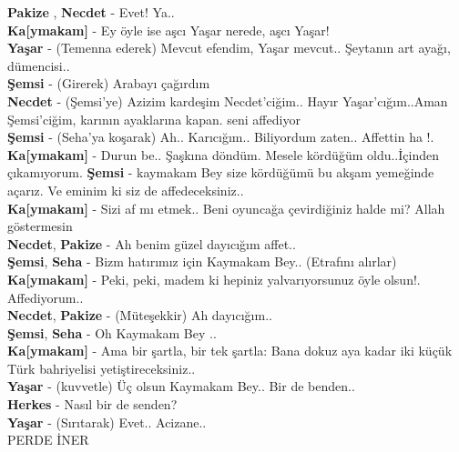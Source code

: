 \documentclass[]{book}
\begin{document}
\textbf{Pakize} , \textbf{Necdet} - Evet! Ya..\\
\textbf{Ka{[}ymakam{]}} - Ey öyle ise aşcı Yaşar nerede, aşcı Yaşar!\\
\textbf{Yaşar} - (Temenna ederek) Mevcut efendim, Yaşar mevcut.. Şeytanın art ayağı, dümencisi..\\
\textbf{Şemsi} - (Girerek) Arabayı çağırdım\\
\textbf{Necdet} - (Şemsi'ye) Azizim kardeşim Necdet'ciğim.. Hayır Yaşar'cığım..Aman Şemsi'ciğim, karının ayaklarına kapan. seni affediyor\\
\textbf{Şemsi} - (Seha'ya koşarak) Ah.. Karıcığım.. Biliyordum zaten.. Affettin ha !.\\
\textbf{Ka{[}ymakam{]}} - Durun be.. Şaşkına döndüm. Mesele kördüğüm oldu..İçinden çıkamıyorum.
\textbf{Şemsi} - kaymakam Bey size kördüğümü bu akşam yemeğinde açarız. Ve eminim ki siz de affedeceksiniz..\\
\textbf{Ka{[}ymakam{]}} - Sizi af mı etmek.. Beni oyuncağa çevirdiğiniz halde mi? Allah göstermesin\\
\textbf{Necdet}, \textbf{Pakize} - Ah benim güzel dayıcığım affet..\\
\textbf{Şemsi}, \textbf{Seha} - Bizm hatırımız için Kaymakam Bey.. (Etrafını alırlar)\\
\textbf{Ka{[}ymakam{]}} - Peki, peki, madem ki hepiniz yalvarıyorsunuz öyle olsun!. Affediyorum..\\
\textbf{Necdet}, \textbf{Pakize} - (Müteşekkir) Ah dayıcığım..\\
\textbf{Şemsi}, \textbf{Seha} - Oh Kaymakam Bey ..\\
\textbf{Ka{[}ymakam{]}} - Ama bir şartla, bir tek şartla: Bana dokuz aya kadar iki küçük Türk bahriyelisi yetiştireceksiniz..\\
\textbf{Yaşar} - (kuvvetle) Üç olsun Kaymakam Bey.. Bir de benden..\\
\textbf{Herkes} - Nasıl bir de senden?\\
\textbf{Yaşar} - (Sırıtarak) Evet.. Acizane..\\

PERDE İNER


\end{document}
